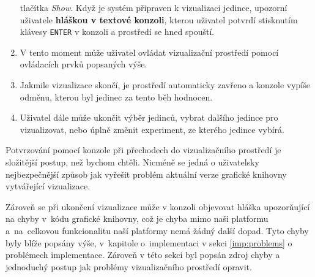 \begin{enumerate}
        tlačítka \emph{Show}. Když je systém připraven k vizualizaci jedince,
        upozorní uživatele \textbf{hláškou v textové konzoli}, kterou uživatel
        potvrdí stisknutím klávesy \texttt{ENTER} v konzoli a prostředí se hned
        spouští.
    \item V tento moment může uživatel ovládat vizualizační prostředí pomocí
        ovládacích prvků popsaných výše.
    \item Jakmile vizualizace skončí, je prostředí automaticky zavřeno a
        konzole vypíše odměnu, kterou byl jedinec za tento běh hodnocen.
    \item Uživatel dále může ukončit výběr jedinců, vybrat dalšího jedince pro
        vizualizovat, nebo úplně změnit experiment, ze kterého jedince vybírá.
\end{enumerate}
Potvrzování pomocí konzole při přechodech do vizualizačního prostředí je
složitější postup, než bychom chtěli. Nicméně se jedná o uživatelsky
nejbezpečnější způsob jak vyřešit problém aktuální verze grafické knihovny
vytvářející vizualizace. 

Zároveň se při ukončení vizualizace může v konzoli objevovat hláška
upozorňující na chyby v~kódu grafické knihovny, což je chyba mimo naši
platformu a~na~celkovou funkcionalitu naší platformy nemá žádný další dopad.
Tyto chyby byly blíže popsány výše, v~kapitole o~implementaci v sekci
\ref{imp:problems} o problémech implementace. Zároveň v této sekci byl popsán
zdroj chyby a jednoduchý postup jak problémy vizualizačního prostředí opravit.
